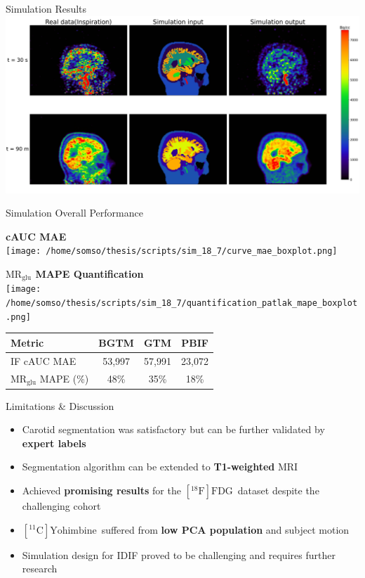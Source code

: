 \documentclass[aspectratio=169]{beamer}
\def\mrglu{\text{MR}_{\text{glu}}}
\newcommand{\fdg}{$[^{18}\mathrm{F}]\text{FDG}$}
\newcommand{\yohimbine}{$[^{11}\mathrm{C}]\text{Yohimbine}$}
\begin{document}
\begin{frame}{Simulation Results}
	\includegraphics[width=\textwidth]{sim_compare2.jpg}

\end{frame}

\begin{frame}[t]{Simulation Overall Performance}
	\centering
	\begin{center}
		\begin{minipage}{0.35\textwidth}
			\centering
			\textbf{cAUC MAE}\\[0.5ex]
			\texttt{[image: /home/somso/thesis/scripts/sim\_18\_7/curve\_mae\_boxplot.png]}
		\end{minipage}
		\hspace{2em}
		\begin{minipage}{0.35\textwidth}
			\centering
			\textbf{$\mrglu$ MAPE Quantification}\\[0.5ex]
			\texttt{[image: /home/somso/thesis/scripts/sim\_18\_7/quantification\_patlak\_mape\_boxplot.png]}
		\end{minipage}
	\end{center}
	{
	\small
	\begin{tabular}{l|ccc}
		\toprule
		Metric             & BGTM   & GTM    & PBIF   \\
		\midrule
		IF cAUC MAE        & 53,997 & 57,991 & 23,072 \\
		$\mrglu$ MAPE (\%) & 48\%   & 35\%   & 18\%   \\
		\bottomrule
	\end{tabular}

	}
\end{frame}
\begin{frame}{Limitations \& Discussion}
	\begin{itemize}
		\setlength\itemsep{2em}
		\item Carotid segmentation was satisfactory but can be further validated by \textbf{expert labels}
		\item Segmentation algorithm can be extended to \textbf{T1-weighted} MRI
		\item Achieved \textbf{promising results} for the \fdg\ dataset despite the challenging cohort
        \item \yohimbine\ suffered from \textbf{low PCA population} and subject motion
		\item Simulation design for IDIF proved to be challenging and requires further research
	\end{itemize}
\end{frame}
\end{document}
